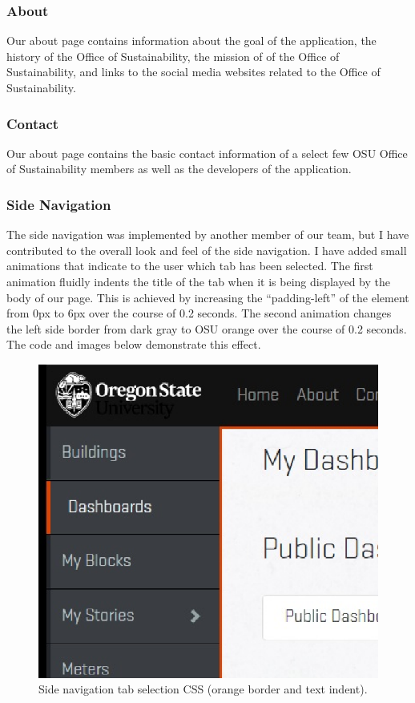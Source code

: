 \documentclass[letterpaper,10pt,serif,draftclsnofoot,onecolumn,compsoc,titlepage]{IEEEtran}
\begin{document}
			\subsubsection{About}
			Our about page contains information about the goal of the application, the history of the Office of Sustainability, the mission of of the Office of Sustainability,
			and links to the social media websites related to the Office of Sustainability.
			\subsubsection{Contact}
			Our about page contains the basic contact information of a select few OSU Office of Sustainability members as well as the developers of the application.
			
	\subsubsection{Side Navigation}
	The side navigation was implemented by another member of our team, but I have contributed to the overall look and feel of the side navigation. I have added small
	animations that indicate to the user which tab has been selected. The first animation fluidly indents the title of the tab when it is being displayed by the 
	body of our page. This is achieved by increasing the ``padding-left'' of the element from 0px to 6px over the course of 0.2 seconds. The second animation changes the 
	left side border from dark gray to OSU orange over the course of 0.2 seconds. The code and images below demonstrate this effect.
	
\begin{figure}[H]
  \centering
  \includegraphics[width=17cm]{images/side-nav-css.eps}
  \caption{Side navigation tab selection CSS (orange border and text indent).}
\end{figure}
	
\end{document}
